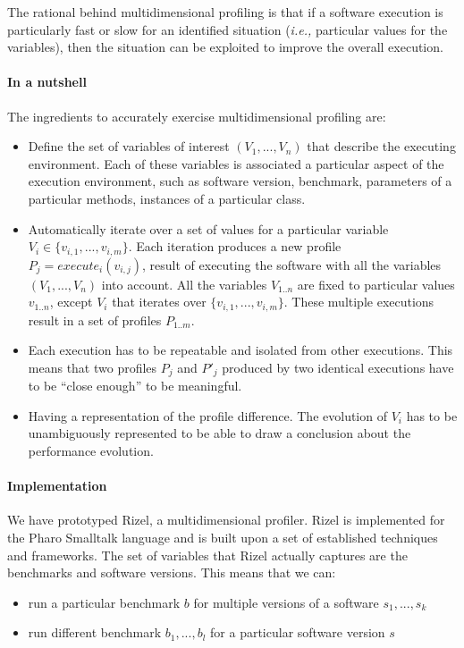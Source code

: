 \documentclass{sig-alternate}
\newcommand{\ie}{\emph{i.e.,}\xspace}
\begin{document}
The rational behind multidimensional profiling is that if a software execution is particularly fast or slow for an identified situation (\ie particular values for the variables), then the situation can be exploited to improve the overall execution.
\paragraph{In a nutshell}

The ingredients to accurately exercise multidimensional profiling are:

\begin{itemize}
\item Define the set of variables of interest $(V_1, ..., V_n)$ that describe the executing environment. Each of these variables is associated a particular aspect of the execution environment, such as software version, benchmark, parameters of a particular methods, instances of a particular class. 

\item Automatically iterate over a set of values for a particular variable $V_i \in \{v_{i,1}, ..., v_{i,m}\}$. Each iteration produces a new profile $P_j = \textit{execute}_i(v_{i,j})$, result of executing the software with all the variables $(V_1, ..., V_n)$ into account. All the variables $V_{1..n}$ are fixed to particular values $v_{1..n}$, except $V_i$ that iterates over $\{v_{i,1}, ..., v_{i,m}\}$. These multiple executions result in a set of profiles $P_{1..m}$. 

\item Each execution has to be repeatable and isolated from other executions. This means that two profiles $P_j$ and $P'_j$ produced by two identical executions have to be ``close enough'' to be meaningful.

\item Having a representation of the profile difference. The evolution of $V_i$ has to be unambiguously represented to be able to draw a conclusion about the performance evolution.
\end{itemize}

\paragraph{Implementation}
We have prototyped Rizel, a multidimensional profiler. Rizel is implemented for the Pharo Smalltalk language and is built upon a set of established techniques and frameworks. The set of variables that Rizel actually captures are the benchmarks and software versions. This means that we can:
\begin{itemize}
\item run a particular benchmark $b$ for multiple versions of a software $s_1, ... , s_k$
\item run different benchmark $b_1, ..., b_l$ for a particular software version $s$
\end{itemize}
\end{document}
